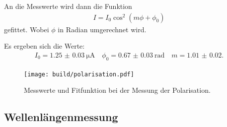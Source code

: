 An die Messwerte wird dann die Funktion
\begin{align}
  I = I_0\cos^2(m\phi + \phi_0)
\end{align}
gefittet. Wobei $\phi$ in Radian umgerechnet wird.

Es ergeben sich die Werte:
\begin{align}
  I_0 = \SI{1.25(3)}{\micro\ampere} \quad \phi_0 = \SI{0.67(3)}{\radian} \quad m = \num{1.01(2)}.
\end{align}

\begin{figure}
  \centering
  \texttt{[image: build/polarisation.pdf]}
  \caption{Messwerte und Fitfunktion bei der Messung der Polarisation.}
  \label{fig:polarisation}
\end{figure}

\subsection{Wellenlängenmessung}
\label{sec:wellenlaenge}

